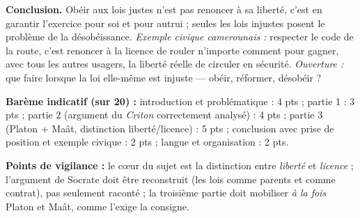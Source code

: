 \documentclass[11pt]{article}
\begin{document}
\begin{corrige}
\medskip
\textbf{Conclusion.} Obéir aux lois justes n'est pas renoncer à sa liberté, c'est en garantir l'exercice pour soi et pour autrui ; seules les lois injustes posent le problème de la désobéissance. \emph{Exemple civique camerounais :} respecter le code de la route, c'est renoncer à la licence de rouler n'importe comment pour gagner, avec tous les autres usagers, la liberté réelle de circuler en sécurité. \emph{Ouverture :} que faire lorsque la loi elle-même est injuste — obéir, réformer, désobéir ?

\medskip
\textbf{Barème indicatif (sur 20) :} introduction et problématique : 4 pts ; partie 1 : 3 pts ; partie 2 (argument du \emph{Criton} correctement analysé) : 4 pts ; partie 3 (Platon + Maât, distinction liberté/licence) : 5 pts ; conclusion avec prise de position et exemple civique : 2 pts ; langue et organisation : 2 pts.

\medskip
\textbf{Points de vigilance :} le cœur du sujet est la distinction entre \emph{liberté} et \emph{licence} ; l'argument de Socrate doit être reconstruit (les lois comme parents et comme contrat), pas seulement raconté ; la troisième partie doit mobiliser \emph{à la fois} Platon et Maât, comme l'exige la consigne.
\end{corrige}
\end{document}
